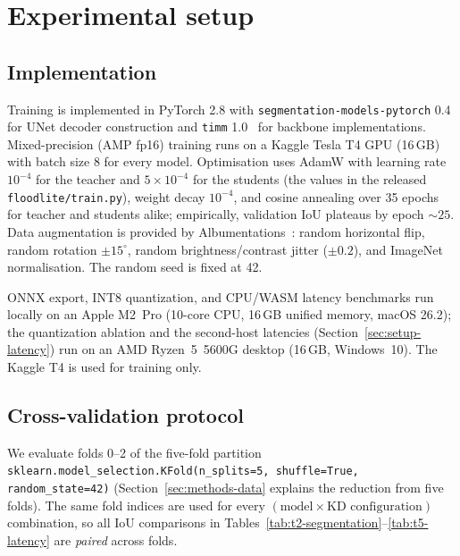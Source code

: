 
\section{Experimental setup}
\label{sec:experimental-setup}

\subsection{Implementation}
\label{sec:setup-impl}

Training is implemented in PyTorch 2.8 with \texttt{segmentation-models-pytorch} 0.4~\cite{iakubovskii2019smp} for UNet decoder construction and \texttt{timm} 1.0~\cite{wightman2019timm} for backbone implementations. Mixed-precision (AMP fp16) training runs on a Kaggle Tesla T4 GPU (16\,GB) with batch size 8 for every model. Optimisation uses AdamW with learning rate $10^{-4}$ for the teacher and $5\!\times\!10^{-4}$ for the students (the values in the released \texttt{floodlite/train.py}), weight decay $10^{-4}$, and cosine annealing over 35 epochs for teacher and students alike; empirically, validation IoU plateaus by epoch $\sim 25$. Data augmentation is provided by Albumentations~\cite{buslaev2020albumentations}: random horizontal flip, random rotation $\pm 15^{\circ}$, random brightness/contrast jitter ($\pm 0.2$), and ImageNet normalisation. The random seed is fixed at 42.

ONNX export, INT8 quantization, and CPU/WASM latency benchmarks run locally on an Apple M2~Pro (10-core CPU, 16\,GB unified memory, macOS 26.2); the quantization ablation and the second-host latencies (Section~\ref{sec:setup-latency}) run on an AMD Ryzen~5~5600G desktop (16\,GB, Windows~10). The Kaggle T4 is used for training only.

\subsection{Cross-validation protocol}
\label{sec:setup-cv}

We evaluate folds 0--2 of the five-fold partition \texttt{sklearn.\allowbreak{}model\_selection.\allowbreak{}KFold(n\_splits=5,\allowbreak\,shuffle=True,\allowbreak\,random\_state=42)} (Section~\ref{sec:methods-data} explains the reduction from five folds). The same fold indices are used for every $(\text{model} \times \text{KD configuration})$ combination, so all IoU comparisons in Tables~\ref{tab:t2-segmentation}--\ref{tab:t5-latency} are \emph{paired} across folds.

